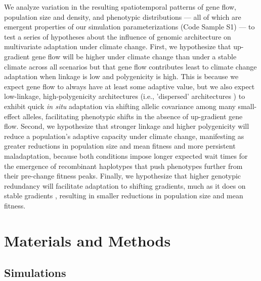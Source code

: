 \documentclass[9pt,twocolumn,twoside,lineno]{new_article}
\begin{document}
We analyze variation in the resulting spatiotemporal
patterns of gene flow, population size and density, and phenotypic
distributions --- all of which are emergent properties of our simulation
parameterizations (Code Sample S1) --- 
to test a series of hypotheses about the influence of genomic architecture 
on multivariate adaptation under climate change. First, we hypothesize that up-gradient 
gene flow will be higher under climate change than under a stable climate across all
scenarios but that gene flow contributes least to climate change adaptation when
linkage is low and polygenicity is high.
This is because we expect gene flow to always have
at least some adaptive value, but we also expect low-linkage, high-polygenicity architectures 
(i.e., 'dispersed' architectures \cite{yeaman_review}) to exhibit quick \textit{in situ}
adaptation via shifting allelic covariance among many small-effect alleles, facilitating phenotypic shifts in the absence of up-gradient gene flow.
Second, we hypothesize that stronger linkage 
and higher polygenicity will reduce a population's adaptive capacity under climate change,
manifesting as greater reductions in population size and mean fitness
and more persistent maladaptation, because both conditions impose longer expected
wait times for the emergence of recombinant haplotypes that push phenotypes
further from their pre-change fitness peaks. Finally, we hypothesize that higher genotypic redundancy
will facilitate adaptation to shifting gradients, much as it does on stable gradients 
\cite{barghi_redundancy,manceau,yeaman_amnat}, resulting in smaller reductions 
in population size and mean fitness.


\section*{Materials and Methods}

\subsection*{Simulations}
\end{document}
